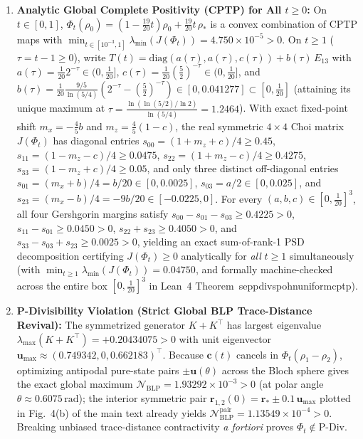 \documentclass[onecolumn,10pt,notitlepage,amsmath,amssymb,floatfix]{revtex4-2}
\theoremstyle{plain}
\theoremstyle{definition}
\newcommand{\NBLP}{\mathcal{N}_{\mathrm{BLP}}}
\newcommand{\leanid}[1]{{\footnotesize\ttfamily\def\_{\textunderscore\penalty0\hspace{0pt}}#1}}
\begin{document}
\begin{enumerate}[label=(\roman*),leftmargin=1.8em,itemsep=2pt]
\item \textbf{Analytic Global Complete Positivity (CPTP) for All $t \ge 0$:} On $t \in [0, 1]$, $\Phi_t(\rho_0) = (1 - \frac{19}{20}t)\rho_0 + \frac{19}{20}t\,\rho_*$ is a convex combination of CPTP maps with $\min_{t\in[10^{-3},1]}\lambda_{\min}(J(\Phi_t)) = 4.750\times 10^{-5} > 0$. On $t \ge 1$ ($\tau = t - 1 \ge 0$), write $T(t) = \mathrm{diag}(a(\tau), a(\tau), c(\tau)) + b(\tau)\,E_{13}$ with $a(\tau) = \frac{1}{20}2^{-\tau} \in (0, \frac{1}{20}]$, $c(\tau) = \frac{1}{20}(\frac{5}{2})^{-\tau} \in (0, \frac{1}{20}]$, and $b(\tau) = \frac{1}{20}\frac{9/5}{\ln(5/4)}(2^{-\tau} - (\frac{5}{2})^{-\tau}) \in [0, 0.041277] \subset [0, \frac{1}{20}]$ (attaining its unique maximum at $\tau = \frac{\ln(\ln(5/2)/\ln 2)}{\ln(5/4)} = 1.2464$). With exact fixed-point shift $m_x = -\frac{4}{5}b$ and $m_z = \frac{4}{5}(1-c)$, the real symmetric $4\times 4$ Choi matrix $J(\Phi_t)$ has diagonal entries $s_{00} = (1+m_z+c)/4 \ge 0.45$, $s_{11} = (1-m_z-c)/4 \ge 0.0475$, $s_{22} = (1+m_z-c)/4 \ge 0.4275$, $s_{33} = (1-m_z+c)/4 \ge 0.05$, and only three distinct off-diagonal entries $s_{01} = (m_x+b)/4 = b/20 \in [0, 0.0025]$, $s_{03} = a/2 \in [0, 0.025]$, and $s_{23} = (m_x-b)/4 = -9b/20 \in [-0.0225, 0]$. For every $(a,b,c) \in [0,\frac{1}{20}]^3$, all four Gershgorin margins satisfy $s_{00}-s_{01}-s_{03} \ge 0.4225 > 0$, $s_{11}-s_{01} \ge 0.0450 > 0$, $s_{22}+s_{23} \ge 0.4050 > 0$, and $s_{33}-s_{03}+s_{23} \ge 0.0025 > 0$, yielding an exact sum-of-rank-1 PSD decomposition certifying $J(\Phi_t) \ge 0$ analytically for \emph{all} $t \ge 1$ simultaneously (with $\min_{t\ge 1}\lambda_{\min}(J(\Phi_t)) = 0.04750$, and formally machine-checked across the entire box $[0,\frac{1}{20}]^3$ in Lean~4 Theorem~\leanid{sep\_pdiv\_spohn\_uniform\_cptp}).
\item \textbf{P-Divisibility Violation (Strict Global BLP Trace-Distance Revival):} The symmetrized generator $K + K^\top$ has largest eigenvalue $\lambda_{\max}(K + K^\top) = +0.20434075 > 0$ with unit eigenvector $\mathbf{u}_{\max} \approx (0.749342, 0, 0.662183)^\top$. Because $\mathbf{c}(t)$ cancels in $\Phi_t(\rho_1 - \rho_2)$, optimizing antipodal pure-state pairs $\pm \mathbf{u}(\theta)$ across the Bloch sphere gives the exact global maximum $\NBLP = 1.93292\times 10^{-3} > 0$ (at polar angle $\theta \approx 0.6075\,\mathrm{rad}$); the interior symmetric pair $\mathbf{r}_{1,2}(0) = \mathbf{r}_* \pm 0.1\,\mathbf{u}_{\max}$ plotted in Fig.~4(b) of the main text already yields $\NBLP^{\mathrm{pair}} = 1.13549\times 10^{-4} > 0$. Breaking unbiased trace-distance contractivity \emph{a fortiori} proves $\Phi_t \notin \mathrm{P\text{-}Div}$.

\end{enumerate}
\end{document}
